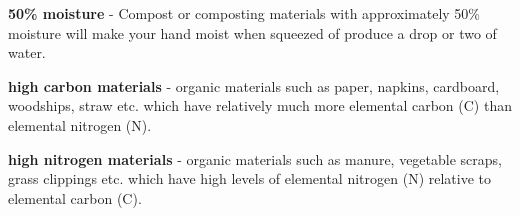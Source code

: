 \textbf{50\% moisture} - Compost or composting materials with
approximately 50\% moisture will make your hand moist when squeezed of
produce a drop or two of water.

\textbf{high carbon materials} - organic materials such as paper,
napkins, cardboard, woodships, straw etc. which have relatively much
more elemental carbon (C) than elemental nitrogen (N).

\textbf{high nitrogen materials} - organic materials such as manure,
vegetable scraps, grass clippings etc. which have high levels of
elemental nitrogen (N) relative to elemental carbon (C).
